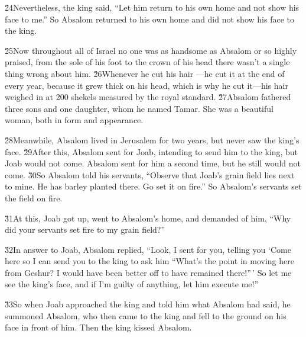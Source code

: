 \v{24}Nevertheless, the king said, ``Let him return to his own home and not show his face to me.'' So Absalom returned to his own home and did not show his face to the king.

\v{25}Now throughout all of Israel no one was as handsome as Absalom or so highly praised, from the sole of his foot to the crown of his head there wasn't a single thing wrong about him. \v{26}Whenever he cut his hair ---he cut it at the end of every year, because it grew thick on his head, which is why he cut it---his hair weighed in at 200 shekels measured by the royal standard. \v{27}Absalom fathered three sons and one daughter, whom he named Tamar. She was a beautiful woman, both in form and appearance.

\v{28}Meanwhile, Absalom lived in Jerusalem for two years, but never saw the king's face. \v{29}After this, Absalom sent for Joab, intending to send him to the king, but Joab would not come. Absalom sent for him a second time, but he still would not come. \v{30}So Absalom told his servants, ``Observe that Joab's grain field lies next to mine. He has barley planted there. Go set it on fire.'' So Absalom's servants set the field on fire.

\v{31}At this, Joab got up, went to Absalom's home, and demanded of him, ``Why did your servants set fire to my grain field?''

\v{32}In answer to Joab, Absalom replied, ``Look, I sent for you, telling you `Come here so I can send you to the king to ask him ``What's the point in moving here from Geshur? I would have been better off to have remained there!''\,' So let me see the king's face, and if I'm guilty of anything, let him execute me!''

\v{33}So when Joab approached the king and told him what Absalom had said, he summoned Absalom, who then came to the king and fell to the ground on his face in front of him. Then the king kissed Absalom.

